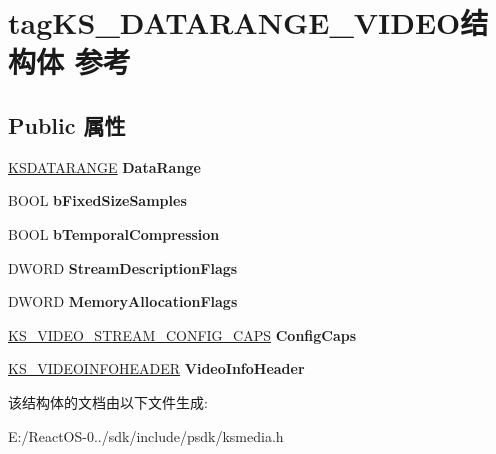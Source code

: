 \hypertarget{structtag_k_s___d_a_t_a_r_a_n_g_e___v_i_d_e_o}{}\section{tag\+K\+S\+\_\+\+D\+A\+T\+A\+R\+A\+N\+G\+E\+\_\+\+V\+I\+D\+E\+O结构体 参考}
\label{structtag_k_s___d_a_t_a_r_a_n_g_e___v_i_d_e_o}
\subsection*{Public 属性}
\begin{DoxyCompactItemize}
\item 
\mbox{\label{structtag_k_s___d_a_t_a_r_a_n_g_e___v_i_d_e_o_ac860e4026ca98f6e33534fed0772a67d}} 
\hyperlink{struct_k_s_d_a_t_a_f_o_r_m_a_t}{K\+S\+D\+A\+T\+A\+R\+A\+N\+GE} {\bfseries Data\+Range}
\item 
\mbox{\label{structtag_k_s___d_a_t_a_r_a_n_g_e___v_i_d_e_o_a13fe9022f8d0184f8ecbe5afaaaebbac}} 
B\+O\+OL {\bfseries b\+Fixed\+Size\+Samples}
\item 
\mbox{\label{structtag_k_s___d_a_t_a_r_a_n_g_e___v_i_d_e_o_a052b3b11ea3e5b7dc43e56da8f175065}} 
B\+O\+OL {\bfseries b\+Temporal\+Compression}
\item 
\mbox{\label{structtag_k_s___d_a_t_a_r_a_n_g_e___v_i_d_e_o_a260342ce186439e8206e025862a624e8}} 
D\+W\+O\+RD {\bfseries Stream\+Description\+Flags}
\item 
\mbox{\label{structtag_k_s___d_a_t_a_r_a_n_g_e___v_i_d_e_o_a23f71ed56165290abf6a7d7c6618ae34}} 
D\+W\+O\+RD {\bfseries Memory\+Allocation\+Flags}
\item 
\mbox{\label{structtag_k_s___d_a_t_a_r_a_n_g_e___v_i_d_e_o_a29e153843bb90e9912691fe65cf42866}} 
\hyperlink{struct___k_s___v_i_d_e_o___s_t_r_e_a_m___c_o_n_f_i_g___c_a_p_s}{K\+S\+\_\+\+V\+I\+D\+E\+O\+\_\+\+S\+T\+R\+E\+A\+M\+\_\+\+C\+O\+N\+F\+I\+G\+\_\+\+C\+A\+PS} {\bfseries Config\+Caps}
\item 
\mbox{\label{structtag_k_s___d_a_t_a_r_a_n_g_e___v_i_d_e_o_a2ef910ad134685bafb37f9ef2ea6e1c9}} 
\hyperlink{structtag_k_s___v_i_d_e_o_i_n_f_o_h_e_a_d_e_r}{K\+S\+\_\+\+V\+I\+D\+E\+O\+I\+N\+F\+O\+H\+E\+A\+D\+ER} {\bfseries Video\+Info\+Header}
\end{DoxyCompactItemize}


该结构体的文档由以下文件生成\+:\begin{DoxyCompactItemize}
\item 
E\+:/\+React\+O\+S-\/0../sdk/include/psdk/ksmedia.\+h\end{DoxyCompactItemize}
